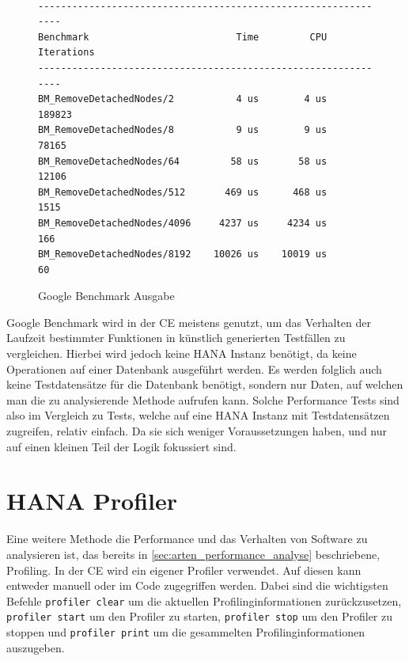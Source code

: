\begin{figure}[h]
    \begin{center}
        \begin{verbatim}

---------------------------------------------------------------
Benchmark                          Time         CPU Iterations 
---------------------------------------------------------------
BM_RemoveDetachedNodes/2           4 us        4 us     189823 
BM_RemoveDetachedNodes/8           9 us        9 us      78165 
BM_RemoveDetachedNodes/64         58 us       58 us      12106 
BM_RemoveDetachedNodes/512       469 us      468 us       1515 
BM_RemoveDetachedNodes/4096     4237 us     4234 us        166 
BM_RemoveDetachedNodes/8192    10026 us    10019 us         60 
        \end{verbatim}
    \end{center}
    \caption{Google Benchmark Ausgabe}\label{fig:google_benchmark_ausgabe}
\end{figure}

Google Benchmark wird in der \ac{CE} meistens genutzt, um das Verhalten der
Laufzeit bestimmter Funktionen in künstlich generierten Testfällen zu
vergleichen. Hierbei wird jedoch keine HANA Instanz benötigt, da
keine Operationen auf einer Datenbank ausgeführt werden. Es werden folglich
auch keine Testdatensätze für die Datenbank benötigt, sondern nur Daten, auf
welchen man die zu analysierende Methode aufrufen kann. Solche Performance
Tests sind also im Vergleich zu Tests, welche auf eine HANA Instanz mit
Testdatensätzen zugreifen, relativ einfach. Da sie sich weniger Voraussetzungen
haben, und nur auf einen kleinen Teil der Logik fokussiert sind.


\section{HANA Profiler}
\label{sec:hana_profiler}


Eine weitere Methode die Performance und das Verhalten von Software zu
analysieren ist, das bereits in \autoref{sec:arten_performance_analyse}
beschriebene, Profiling. In der \ac{CE} wird ein eigener Profiler verwendet.
Auf diesen kann entweder manuell oder im Code zugegriffen werden. Dabei sind
die wichtigsten Befehle \texttt{profiler clear} um die aktuellen
Profilinginformationen zurückzusetzen,  \texttt{profiler start} um den Profiler
zu starten, \texttt{profiler stop} um den Profiler zu stoppen und
\texttt{profiler print} um die gesammelten Profilinginformationen auszugeben.


